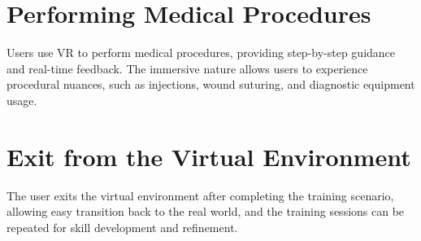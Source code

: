 \section{Performing Medical Procedures}
Users use VR to perform medical procedures, providing step-by-step guidance and real-time feedback. The immersive nature allows users to experience procedural nuances, such as injections, wound suturing, and diagnostic equipment usage.
\section{Exit from the Virtual Environment}
The user exits the virtual environment after completing the training scenario, allowing easy transition back to the real world, and the training sessions can be repeated for skill development and refinement.

